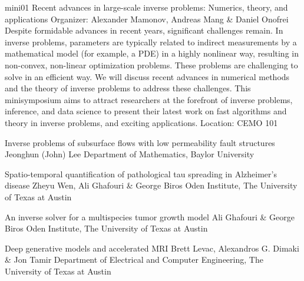 \mini
{mini01}
{Recent advances in large-scale inverse problems: Numerics, theory, and applications}
{Organizer: Alexander Mamonov, Andreas Mang \& Daniel Onofrei}
{Despite formidable advances in recent years, significant challenges remain. In inverse problems, parameters are typically related to indirect measurements by a mathematical model (for example, a PDE) in a highly nonlinear way, resulting in non-convex, non-linear optimization problems. These problems are challenging to solve in an efficient way. We will discuss recent advances in numerical methods and the theory of inverse problems to address these challenges. This minisymposium aims to attract researchers at the forefront of inverse problems, inference, and data science to present their latest work on fast algorithms and theory in inverse problems, and exciting applications.}
{Location: CEMO 101}


\begin{talks}
\item\talk
{Inverse problems of subsurface flows with low permeability fault structures}
{Jeonghun (John) Lee}
{Department of Mathematics, Baylor University}
\item\talk
{Spatio-temporal quantification of pathological tau spreading in Alzheimer's disease}
{Zheyu Wen, Ali Ghafouri \& George Biros}
{Oden Institute, The University of Texas at Austin}
\item\talk
{An inverse solver for a multispecies tumor growth model}
{Ali Ghafouri \& George Biros}
{Oden Institute, The University of Texas at Austin}
\item\talk
{Deep generative models and accelerated MRI}
{Brett Levac, Alexandros G. Dimaki \& Jon Tamir}
{Department of Electrical and Computer Engineering, The University of Texas at Austin}
\end{talks}

\room
